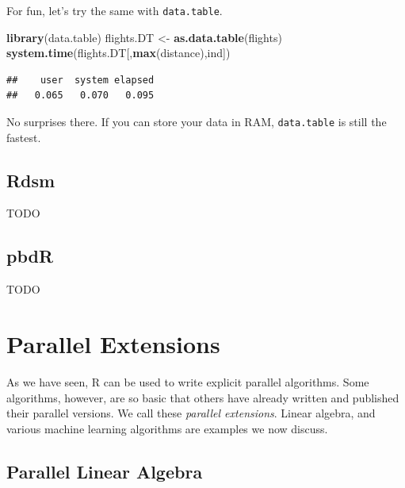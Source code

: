 \documentclass[]{book}
\newenvironment{Shaded}{\begin{snugshade}}{\end{snugshade}}
\newcommand{\KeywordTok}[1]{\textcolor[rgb]{0.13,0.29,0.53}{\textbf{#1}}}
\newcommand{\NormalTok}[1]{#1}
\newcommand{\StringTok}[1]{\textcolor[rgb]{0.31,0.60,0.02}{#1}}
\theoremstyle{definition}
\theoremstyle{definition}
\theoremstyle{definition}
\theoremstyle{remark}
\begin{document}
For fun, let's try the same with \texttt{data.table}.

\begin{Shaded}
\begin{Highlighting}[]
\KeywordTok{library}\NormalTok{(data.table)}
\NormalTok{flights.DT <-}\StringTok{ }\KeywordTok{as.data.table}\NormalTok{(flights)}
\KeywordTok{system.time}\NormalTok{(flights.DT[,}\KeywordTok{max}\NormalTok{(distance),ind])}
\end{Highlighting}
\end{Shaded}

\begin{verbatim}
##    user  system elapsed 
##   0.065   0.070   0.095
\end{verbatim}

No surprises there.
If you can store your data in RAM, \texttt{data.table} is still the fastest.

\hypertarget{rdsm}{%
\subsection{Rdsm}\label{rdsm}}

TODO

\hypertarget{pbdr}{%
\subsection{pbdR}\label{pbdr}}

TODO

\hypertarget{parallel-extensions}{%
\section{Parallel Extensions}\label{parallel-extensions}}

As we have seen, R can be used to write explicit parallel algorithms.
Some algorithms, however, are so basic that others have already written and published their parallel versions.
We call these \emph{parallel extensions}.
Linear algebra, and various machine learning algorithms are examples we now discuss.

\hypertarget{parallel-linear-algebra}{%
\subsection{Parallel Linear Algebra}\label{parallel-linear-algebra}}
\end{document}
